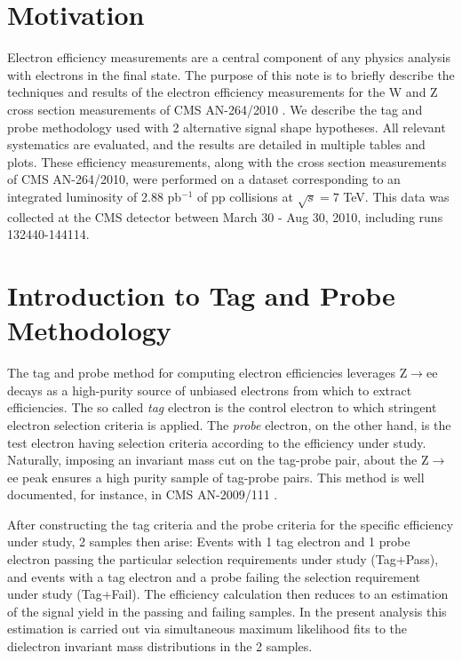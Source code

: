 \section{Motivation}
Electron efficiency measurements are a central component of any physics analysis with electrons in the final state.  The purpose
of this note is to briefly describe the techniques and results of the electron efficiency measurements 
for the W and Z cross section measurements of CMS AN-264/2010 \cite{CMSAN2010/264}.
 We describe the tag and probe methodology used with
2 alternative signal shape hypotheses.  All relevant systematics are evaluated, and the results are detailed in multiple tables and plots.
These efficiency measurements, along with the cross section measurements of CMS AN-264/2010, were performed on a dataset corresponding
to an integrated luminosity of 2.88 pb$^{-1}$ of pp collisions at $\sqrt s = 7$ TeV. 
This data was collected at the CMS detector between March 30 - Aug 30, 2010, including runs 132440-144114.


\section{Introduction to Tag and Probe Methodology}
The tag and probe method for computing electron efficiencies leverages Z$\to$ee decays as a high-purity source of unbiased electrons from which to extract efficiencies.
The so called \textit{tag} electron is the control electron to which stringent electron selection criteria is applied.  The \textit{probe} electron, on the other hand,
is the test electron having selection criteria according to the efficiency under study. Naturally, imposing an invariant mass cut on the tag-probe pair,
about the  Z$\to$ee peak ensures a high purity sample of tag-probe pairs. This method is well documented, for instance, in CMS AN-2009/111 \cite{CMSAN2009/111}.

After constructing the tag criteria and the probe criteria for the specific efficiency under study, 2 samples then arise: Events with 1 tag electron and 1 probe electron passing the particular selection requirements under study (Tag+Pass), and events with a tag electron and a probe failing the selection requirement under study (Tag+Fail).  
The efficiency calculation then reduces to an estimation of the signal yield in the passing and failing samples.  In the present analysis
this estimation is carried out via simultaneous maximum likelihood fits
to the dielectron invariant mass distributions in the 2 samples.

